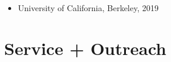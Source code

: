 \documentclass[letterpaper]{deedy-resume} %
\begin{document}
\begin{itemize}
%
% 

\item {{} University of California, Berkeley, 2019}


\end{itemize}



\section{Service + Outreach}

\vspace{0.2cm}

\end{document}
